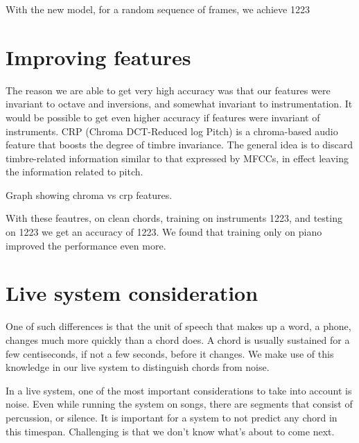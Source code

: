 \documentclass{article}
\begin{document}
With the new model, for a random sequence of frames,  we achieve 1223%


\section{Improving features}

The reason we are able to get very high accuracy was that our features were invariant to octave and inversions, and somewhat invariant to instrumentation. It would be possible to get even higher accuracy if features were invariant of instruments. CRP (Chroma DCT-Reduced log Pitch) is a chroma-based audio feature that boosts the degree of timbre invariance. The general idea is to discard timbre-related information similar to that expressed by MFCCs, in effect leaving the information related to pitch.


Graph showing chroma vs crp features.

With these feautres, on clean chords, training on instruments 1223, and testing on 1223 we get an accuracy of 1223. We found that training only on piano improved the performance even more.

\section{Live system consideration}

One of such differences is that the unit of speech that makes up a word, a phone, changes much more quickly than a chord does. A chord is usually sustained for a few centiseconds, if not a few seconds, before it changes. We make use of this knowledge in our live system to distinguish chords from noise.
 
In a live system, one of the most important considerations to take into account is noise. Even while running the system on songs, there are segments that consist of percussion, or silence. It is important for a system to not predict any chord in this timespan. 
Challenging is that we don't know what's about to come next.



\end{document}

